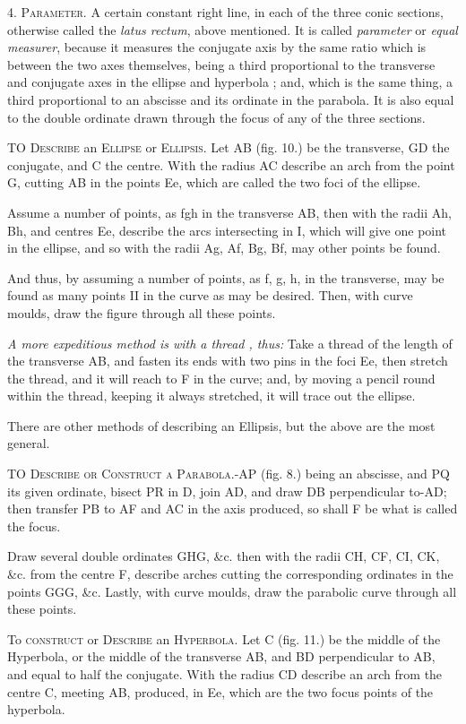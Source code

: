 4. \textsc{Parameter}. A certain constant right line, in each of the three conic sections, otherwise called the \textit{latus rectum}, above mentioned. It is called \textit{parameter} or \textit{equal measurer}, because it measures the conjugate axis by the same ratio which is between the two axes themselves, being a third proportional to the transverse and conjugate axes in the ellipse and hyperbola ; and, which is the same thing, a third proportional to an abscisse and its ordinate in the parabola. It is also equal to the double ordinate drawn through the focus of any of the three sections. 

TO \textsc{Describe} an \textsc{Ellipse} or \textsc{Ellipsis}. Let AB (fig. 10.) be the transverse, GD the conjugate, and C the centre. With the radius AC describe an arch from the point G, cutting AB in the points Ee, which are called the two foci of the ellipse. 

Assume a number of points, as fgh in the transverse AB, then with the radii Ah, Bh, and centres Ee, describe the arcs intersecting in I, which will give one point in the ellipse, and so with the radii Ag, Af, Bg, Bf, may other points be found. 

And thus, by assuming a number of points, as f, g, h, in the transverse, may be found as many points II in the curve as may be desired. Then, with curve moulds, draw the figure through all these points. 

\textit{A more expeditious method is with a thread , thus:} Take a thread of the length of the transverse AB, and fasten its ends with two pins in the foci Ee, then stretch the thread, and it will reach to F in the curve; and, by moving a pencil round within the thread, keeping it always stretched, it will trace out the ellipse. 

There are other methods of describing an Ellipsis, but the above are the most general. 

TO \textsc{Describe or Construct a Parabola}.-AP (fig. 8.) being an abscisse, and PQ its given ordinate, bisect PR in D, join AD, and draw DB perpendicular to-AD; then transfer PB to AF and AC in the axis produced, so shall F be what is called the focus. 

Draw several double ordinates GHG, \&c. then with the radii CH, CF, CI, CK, \&c. from the centre F, describe arches cutting the corresponding ordinates in the points GGG, \&c. Lastly, with curve moulds, draw the parabolic curve through all these points. 

To \textsc{construct} or \textsc{Describe} an \textsc{Hyperbola}. Let C (fig. 11.) be the middle of the Hyperbola, or the middle of the transverse AB, and BD perpendicular to AB, and equal to half the conjugate. With the radius CD describe an arch from the centre C, meeting AB, produced, in Ee, which are the two focus points of the hyperbola. 

